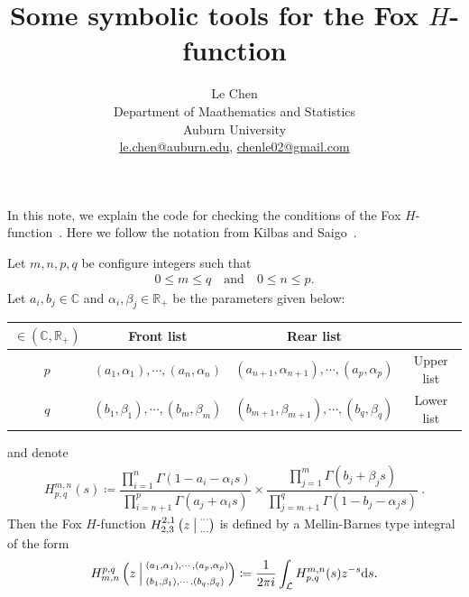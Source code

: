 \documentclass[12pt]{article}
\newcommand{\R}{\mathbb{R}}
\newcommand{\FoxH}[5]{H_{#2}^{#1}\left(#3\:\middle\vert\: \begin{subarray}{l}#4\\[0.4em] #5\end{subarray}\right)}
\newcommand{\ud}{\ensuremath{\mathrm{d}}}
\begin{document}
\title{Some symbolic tools for the {F}ox {$H$}-function}
\author{Le Chen                             \\
  Department of Maathematics and Statistics \\
  Auburn University                         \\
\url{le.chen@auburn.edu}, \url{chenle02@gmail.com}
}

\maketitle

In this note, we explain the code for checking the conditions of the Fox
$H$-function~\cite{fox:61:g}. Here we follow the notation from Kilbas and
Saigo~\cite{kilbas.saigo:04:h-transforms}.


Let $m,n,p,q$ be configure integers such that
\begin{align*}
  0 \le m \le q \quad \text{and} \quad
  0 \le n \le p.
\end{align*}
Let $a_i,b_j\in \mathbb{C}$ and $\alpha_i, \beta_j \in\R_+$ be the parameters given below:
\begin{center}
\renewcommand{\arraystretch}{1.2}
  \begin{tabular}{|c|cc|c|}
    \hline
    $\in \left(\mathbb{C},\R_+\right)$ & Front list                              & Rear list                                       &            \\ \hline
    $p$                                & $(a_1,\alpha_1),\cdots, (a_n,\alpha_n)$ & $(a_{n+1},\alpha_{n+1}),\cdots, (a_p,\alpha_p)$ & Upper list \\
    $q$                                & $(b_1,\beta_1),\cdots, (b_m,\beta_m)$   & $(b_{m+1},\beta_{m+1}),\cdots, (b_q,\beta_q)$   & Lower list \\ \hline
  \end{tabular}
\end{center}
and denote
\begin{align*}
  H^{m,n}_{p,q}(s) \coloneqq
         \dfrac{ \displaystyle \prod_{i=1}^n\Gamma\left(1-a_i-\alpha_is\right) }{ \displaystyle \prod_{i=n+1}^p\Gamma\left(a_j+\alpha_is\right)    }
  \times \dfrac{ \displaystyle \prod_{j=1}^m\Gamma\left(b_j+\beta_js\right)    }{ \displaystyle \prod_{j=m+1}^q\Gamma\left(1- b_j-\alpha_js\right) }\:.
\end{align*}
Then the Fox $H$-function $\FoxH{2,1}{2,3}{z}{\cdots}{\cdots}$ is defined by a Mellin-Barnes type integral of the form
\begin{align*}
  \FoxH{p,q}{m,n}{z}{(a_1,\alpha_1),\cdots, (a_p,\alpha_p)}{(b_1,\beta_1),\cdots, (b_q,\beta_q)}
  \coloneqq \frac{1}{2\pi i} \int_{\mathcal{L}} H^{m,n}_{p,q}(s) z^{-s} \ud s.
\end{align*}
\end{document}
